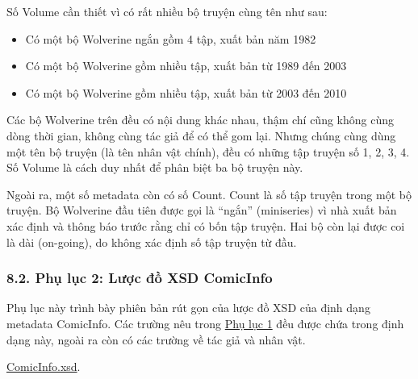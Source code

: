 Số Volume cần thiết vì có rất nhiều bộ truyện cùng tên như sau:

\begin{itemize}
  
  \item
        Có một bộ Wolverine ngắn gồm 4 tập, xuất bản năm 1982
  \item
        Có một bộ Wolverine gồm nhiều tập, xuất bản từ 1989 đến 2003
  \item
        Có một bộ Wolverine gồm nhiều tập, xuất bản từ 2003 đến 2010
\end{itemize}

Các bộ Wolverine trên đều có nội dung khác nhau, thậm chí cũng không
cùng dòng thời gian, không cùng tác giả để có thể gom lại. Nhưng chúng
cùng dùng một tên bộ truyện (là tên nhân vật chính), đều có những tập
truyện số 1, 2, 3, 4. Số Volume là cách duy nhất để phân biệt ba bộ
truyện này.

Ngoài ra, một số metadata còn có số Count. Count là số tập truyện trong
một bộ truyện. Bộ Wolverine đầu tiên được gọi là ``ngắn'' (miniseries)
vì nhà xuất bản xác định và thông báo trước rằng chỉ có bốn tập truyện.
Hai bộ còn lại được coi là dài (on-going), do không xác định số tập
truyện từ đầu.

\hypertarget{phux1ee5-lux1ee5c-2-lux1b0ux1ee3c-ux111ux1ed3-xsd-comicinfo}{%
  \subsubsection{\texorpdfstring{8.2. Phụ lục 2: Lược đồ XSD ComicInfo
    }{8.2. Phụ lục 2: Lược đồ XSD ComicInfo }}\label{phux1ee5-lux1ee5c-2-lux1b0ux1ee3c-ux111ux1ed3-xsd-comicinfo}}

Phụ lục này trình bày phiên bản rút gọn của lược đồ XSD của định dạng
metadata ComicInfo. Các trường nêu trong
\protect\hyperlink{P9.1-metadata}{Phụ lục 1} đều được chứa trong định
dạng này, ngoài ra còn có các trường về tác giả và nhân vật.

\href{../assets/ComicInfo.xsd}{ComicInfo.xsd}.
